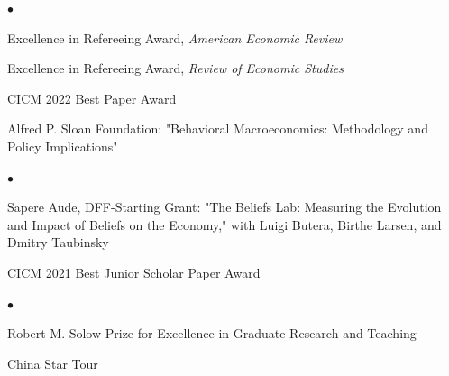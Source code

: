 \documentclass[line]{res}
\newenvironment{list1}{
  \begin{list}{\ding{113}}{%
      \setlength{\itemsep}{0.07in}
      \setlength{\parsep}{0in} \setlength{\parskip}{0in}
		\setlength{\topsep}{0.07in} \setlength{\partopsep}{0in}
      \setlength{\leftmargin}{0.0in}}}{\end{list}}
\newenvironment{list2}{
  \begin{list}{$\bullet$}{%
      \setlength{\itemsep}{0in}
      \setlength{\parsep}{0in} \setlength{\parskip}{0in}
      \setlength{\topsep}{0in} \setlength{\partopsep}{0in} 
      \setlength{\leftmargin}{0in}}}{\end{list}}
\begin{document}
\begin{resume}


\begin{list1}

\item[2022]

\begin{list2}
\item[] Excellence in Refereeing Award, \emph{American Economic Review}
\vspace{0.2cm}
\item[] Excellence in Refereeing Award, \emph{Review of Economic Studies}
\vspace{0.2cm}
\item[] CICM 2022 Best Paper Award

\end{list2}

\item[2021] Alfred P. Sloan Foundation: "Behavioral Macroeconomics: Methodology and Policy Implications"
\begin{list2}
 \vspace{0.2cm}
\item[] Sapere Aude, DFF-Starting Grant: "The Beliefs Lab: Measuring the Evolution and Impact of Beliefs on the Economy," with Luigi Butera, Birthe Larsen, and Dmitry Taubinsky 
\vspace{0.2cm}
\item[] CICM 2021 Best Junior Scholar Paper Award
\end{list2}

\item[2020]
\begin{list2}
\item[] Robert M. Solow Prize for Excellence in Graduate Research and Teaching
\vspace{0.2cm}

\item[] China Star Tour


\end{list2}
\end{list1}
\end{resume}
\end{document}
